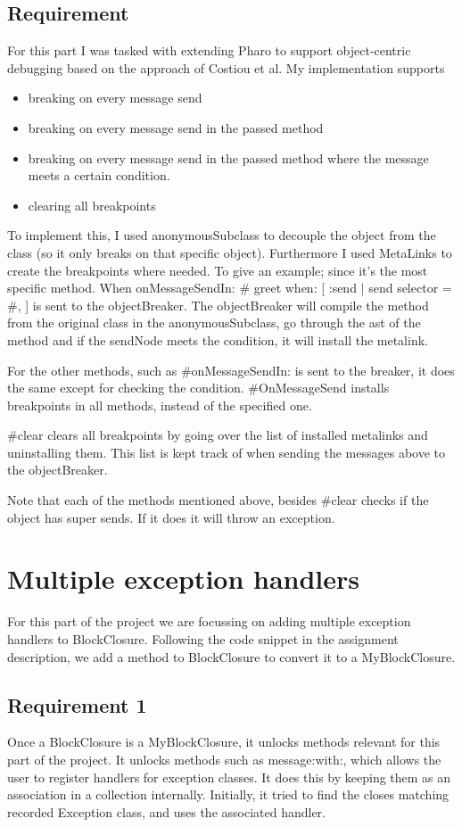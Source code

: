 \documentclass[a4paper]{article}
\begin{document}
\subsection{Requirement}
For this part I was tasked with
extending Pharo to support object-centric debugging based on the approach of Costiou et al.
My implementation supports
\begin{itemize}
	\item breaking on every message send
	\item breaking on every message send in the passed method
	\item breaking on every message send in the passed method where the message
	      meets a certain condition.
	\item clearing all breakpoints
\end{itemize}
To implement this, I used anonymousSubclass to decouple the object from the
class (so it only breaks on that specific object). Furthermore I used MetaLinks
to create the breakpoints where needed. To give an example; since it's the most
specific method. When onMessageSendIn: \# greet when: [ :send $\mid$ send selector =
\#, ]
is sent to the objectBreaker. The objectBreaker will compile the method from the
original class in the anonymousSubclass, go through the ast of the method and if
the sendNode meets the condition, it will install the metalink.
\par
For the other methods, such as \#onMessageSendIn: is sent to the breaker, it does
the same except for checking the condition. \#OnMessageSend installs breakpoints
in all methods, instead of the specified one.
\par
\#clear clears all breakpoints by going over the list of installed metalinks and
uninstalling them. This list is kept track of when sending the messages above to
the objectBreaker.
\par
Note that each of the methods mentioned above, besides \#clear checks if the
object has super sends. If it does it will throw an exception.
\section{Multiple exception handlers}
For this part of the project we are focussing on adding multiple exception
handlers to BlockClosure. Following the code snippet in the assignment
description, we add a method to BlockClosure to convert it to a MyBlockClosure.
\subsection{Requirement 1}
Once a BlockClosure is a MyBlockClosure, it unlocks methods relevant for this
part of the project. It unlocks methods such as message:with:, which allows the
user to register handlers for exception classes. It does this by keeping them as
an association in a collection internally. Initially, it tried to find the
closes matching recorded Exception class, and uses the associated handler.
\end{document}
